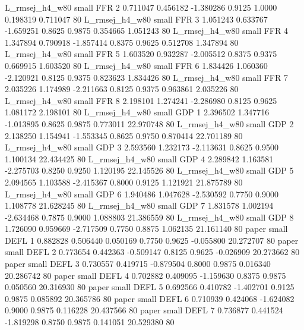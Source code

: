 L_rmsej_h4_w80      small      FFR                 2 0.711047 0.456182 -1.380286 0.9125 1.0000  0.198319    0.711047 80
L_rmsej_h4_w80      small      FFR                 3 1.051243 0.633767 -1.659251 0.8625 0.9875  0.354665    1.051243 80
L_rmsej_h4_w80      small      FFR                 4 1.347894 0.790918 -1.857414 0.8375 0.9625  0.512708    1.347894 80
L_rmsej_h4_w80      small      FFR                 5 1.603520 0.932287 -2.005512 0.8375 0.9375  0.669915    1.603520 80
L_rmsej_h4_w80      small      FFR                 6 1.834426 1.060360 -2.120921 0.8125 0.9375  0.823623    1.834426 80
L_rmsej_h4_w80      small      FFR                 7 2.035226 1.174989 -2.211663 0.8125 0.9375  0.963861    2.035226 80
L_rmsej_h4_w80      small      FFR                 8 2.198101 1.274241 -2.286980 0.8125 0.9625  1.081172    2.198101 80
L_rmsej_h4_w80      small      GDP                 1 2.396502 1.347716 -1.013895 0.8625 0.9875  0.773011   22.970748 80
L_rmsej_h4_w80      small      GDP                 2 2.138250 1.154941 -1.553345 0.8625 0.9750  0.870414   22.701189 80
L_rmsej_h4_w80      small      GDP                 3 2.593560 1.232173 -2.113631 0.8625 0.9500  1.100134   22.434425 80
L_rmsej_h4_w80      small      GDP                 4 2.289842 1.163581 -2.275703 0.8250 0.9250  1.120195   22.145526 80
L_rmsej_h4_w80      small      GDP                 5 2.094565 1.103588 -2.415367 0.8000 0.9125  1.121921   21.875789 80
L_rmsej_h4_w80      small      GDP                 6 1.940486 1.047628 -2.530592 0.7750 0.9000  1.108778   21.628245 80
L_rmsej_h4_w80      small      GDP                 7 1.831578 1.002194 -2.634468 0.7875 0.9000  1.088803   21.386559 80
L_rmsej_h4_w80      small      GDP                 8 1.726090 0.959669 -2.717509 0.7750 0.8875  1.062135   21.161140 80
         paper      small     DEFL                 1 0.882828 0.506440  0.050169 0.7750 0.9625 -0.055800   20.272707 80
         paper      small     DEFL                 2 0.773654 0.442363 -0.509147 0.8125 0.9625 -0.026909   20.273662 80
         paper      small     DEFL                 3 0.730557 0.419715 -0.879504 0.8000 0.9875  0.016340   20.286742 80
         paper      small     DEFL                 4 0.702882 0.409095 -1.159630 0.8375 0.9875  0.050560   20.316930 80
         paper      small     DEFL                 5 0.692566 0.410782 -1.402701 0.9125 0.9875  0.085892   20.365786 80
         paper      small     DEFL                 6 0.710939 0.424068 -1.624082 0.9000 0.9875  0.116228   20.437566 80
         paper      small     DEFL                 7 0.736877 0.441524 -1.819298 0.8750 0.9875  0.141051   20.529380 80
